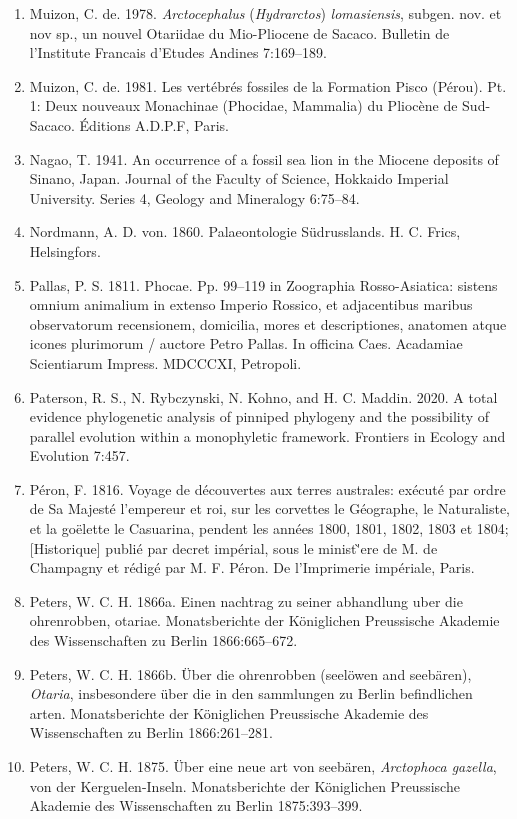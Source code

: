 \documentclass[a4paper, 12pt]{article}
\begin{document}
\begin{enumerate}
\item Muizon, C. de. 1978. \textit{Arctocephalus} (\textit{Hydrarctos}) \textit{lomasiensis}, subgen. nov. et nov sp., un nouvel Otariidae du Mio-Pliocene de Sacaco. Bulletin de l'Institute Francais d'Etudes Andines 7:169–189.
\item Muizon, C. de. 1981. Les vert\'{e}br\'{e}s fossiles de la Formation Pisco (P\'{e}rou). Pt. 1: Deux nouveaux Monachinae (Phocidae, Mammalia) du Plioc\`{e}ne de Sud-Sacaco. \'{E}ditions A.D.P.F, Paris.
\item Nagao, T. 1941. An occurrence of a fossil sea lion in the Miocene deposits of Sinano, Japan. Journal of the Faculty of Science, Hokkaido Imperial University. Series 4, Geology and Mineralogy 6:75–84.
\item Nordmann, A. D. von. 1860. Palaeontologie Südrusslands. H. C. Frics, Helsingfors.
\item Pallas, P. S. 1811. Phocae. Pp. 99–119 in Zoographia Rosso-Asiatica: sistens omnium animalium in extenso Imperio Rossico, et adjacentibus maribus observatorum recensionem, domicilia, mores et descriptiones, anatomen atque icones plurimorum / auctore Petro Pallas. In officina Caes. Acadamiae Scientiarum Impress. MDCCCXI, Petropoli.
\item Paterson, R. S., N. Rybczynski, N. Kohno, and H. C. Maddin. 2020. A total evidence phylogenetic analysis of pinniped phylogeny and the possibility of parallel evolution within a monophyletic framework. Frontiers in Ecology and Evolution 7:457.
\item P\'{e}ron, F. 1816. Voyage de d\'{e}couvertes aux terres australes: ex\'{e}cut\'{e} par ordre de Sa Majest\'{e} l'empereur et roi, sur les corvettes le G\'{e}ographe, le Naturaliste, et la go\"{e}lette le Casuarina, pendent les ann\'{e}es 1800, 1801, 1802, 1803 et 1804; [Historique] publi\'{e} par decret imp\'{e}rial, sous le minist\`'{e}re de M. de Champagny et r\'{e}dig\'{e} par M. F. P\'{e}ron. De l'Imprimerie imp\'{e}riale, Paris.
\item Peters, W. C. H. 1866a. Einen nachtrag zu seiner abhandlung uber die ohrenrobben, otariae. Monatsberichte der K\"{o}niglichen Preussische Akademie des Wissenschaften zu Berlin 1866:665–672.
\item Peters, W. C. H. 1866b. \"{U}ber die ohrenrobben (seel\"{o}wen and seeb\"{a}ren), \textit{Otaria}, insbesondere \"{u}ber die in den sammlungen zu Berlin befindlichen arten. Monatsberichte der K\"{o}niglichen Preussische Akademie des Wissenschaften zu Berlin 1866:261–281.
\item Peters, W. C. H. 1875. \"{U}ber eine neue art von seeb\"{a}ren, \textit{Arctophoca gazella}, von der Kerguelen-Inseln. Monatsberichte der K\"{o}niglichen Preussische Akademie des Wissenschaften zu Berlin 1875:393–399.

\end{enumerate}
\end{document}
